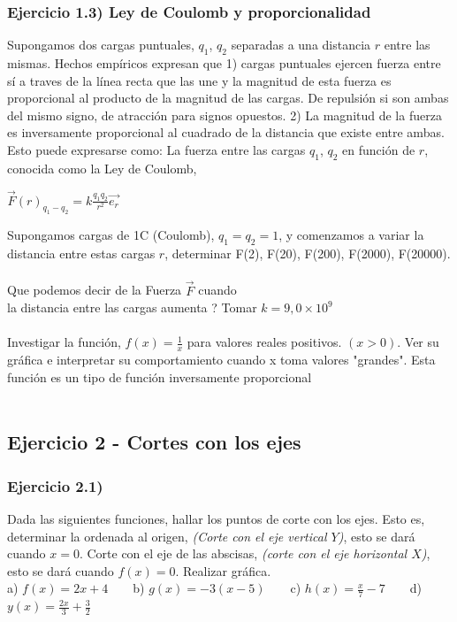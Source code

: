 \documentclass[11pt, a4paper]{article}
\begin{document}
\subsubsection*{ Ejercicio 1.3) Ley de Coulomb y proporcionalidad }
Supongamos dos cargas puntuales, $q_1$, $q_2$ separadas a una distancia $r$ entre las mismas. Hechos emp\'iricos expresan que 1) cargas puntuales ejercen fuerza entre s\'i a traves de la l\'inea recta que las une y la magnitud de esta fuerza es proporcional al producto de la magnitud de las cargas. De repulsi\'on si son ambas del mismo signo, de atracci\'on para signos opuestos. 2) La magnitud de la fuerza es inversamente proporcional al cuadrado de la distancia que existe entre ambas. Esto puede expresarse como: La fuerza entre las cargas $q_1$, $q_2$ en funci\'on de $r$, conocida como la Ley de Coulomb, 
\begin{center}
    $ \displaystyle  \vec{F}(r)_{q_1 - q_2} = k \frac{q_1q_2}{r^2} \vec{e_r} $
\end{center}
Supongamos cargas de 1C (Coulomb), $q_1= q_2 = 1$, y comenzamos a variar la distancia entre estas cargas $r$, determinar F(2), F(20), F(200), F(2000), F(20000). \\ \\
Que podemos decir de la Fuerza $\vec{F}$ cuando \\ la distancia entre las cargas aumenta ? Tomar $ k = 9,0 \times 10^9$ \\ \\ 
Investigar la funci\'on, $\displaystyle f(x) = \frac{1}{x}$ para valores reales positivos. $( x > 0 )$. Ver su gr\'afica e interpretar su comportamiento cuando x toma valores "grandes". Esta funci\'on es un tipo de funci\'on inversamente proporcional \\ \\

\subsection*{Ejercicio 2 - Cortes con los ejes }
\subsubsection*{ Ejercicio 2.1) } Dada las siguientes funciones, hallar los puntos de corte con los ejes. Esto es, determinar la ordenada al origen, \textit{(Corte con el eje vertical $Y$)}, esto se dar\'a cuando $x=0$. Corte con el eje de las abscisas, \textit{(corte con el eje horizontal $X$)}, esto se dar\'a cuando $f(x) = 0$. Realizar gr\'afica.  \\ 
a) $f(x) = 2x + 4 $ ~ ~ b) $g(x) = -3(x - 5) $ ~ ~ c) $\displaystyle h(x) = \frac{x}{7} - 7 $ ~ ~
d) $\displaystyle y(x) = \frac{2x}{3} + \frac{3}{2} $ \\ 
\end{document}
